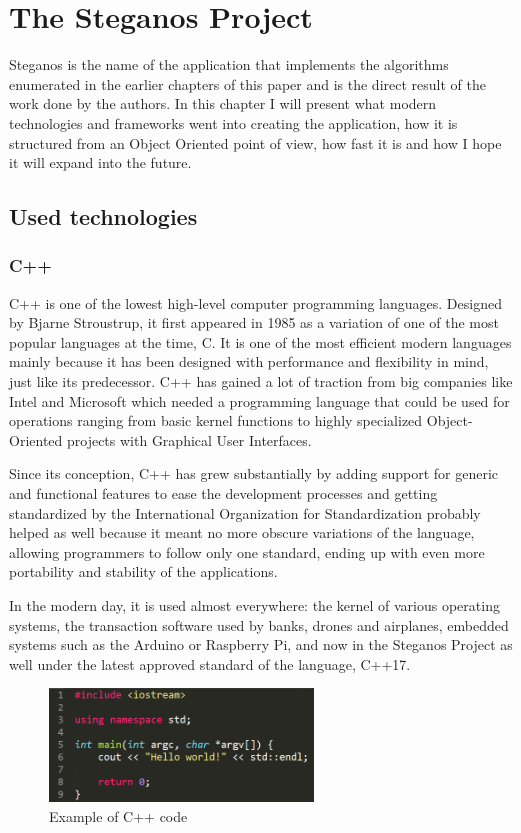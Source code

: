 
\chapter{The Steganos Project}
\begin{multicols*}{2}
Steganos is the name of the application that implements the algorithms enumerated in the earlier chapters of this paper and is the direct result of the work done by the authors. In this chapter I will present what modern technologies and frameworks went into creating the application, how it is structured from an Object Oriented point of view, how fast it is and how I hope it will expand into the future.

\section{Used technologies}
\subsection{C++}
C++ is one of the lowest high-level computer programming languages. Designed by Bjarne Stroustrup, it first appeared in 1985 as a variation of one of the most popular languages at the time, C. It is one of the most efficient modern languages mainly because it has been designed with performance and flexibility in mind, just like its predecessor. C++ has gained a lot of traction  from big companies like Intel and Microsoft which needed a programming language that could be used for operations ranging from basic kernel functions to highly specialized Object-Oriented projects with Graphical User Interfaces\cite{c++-programmming-language}.

Since its conception, C++ has grew substantially by adding support for generic and functional features to ease the development processes and getting standardized by the International Organization for Standardization probably helped as well because it meant no more obscure variations of the language, allowing programmers to follow only one standard, ending up with even more portability and stability of the applications.

In the modern day, it is used almost everywhere: the kernel of various operating systems, the transaction software used by banks, drones and airplanes, embedded systems such as the Arduino or Raspberry Pi, and now in the Steganos Project as well under the latest approved standard of the language, C++17.

\begin{figure}[H]
    \centering
    \includegraphics[width=7cm,keepaspectratio]{pics/example_of_cpp_code}
    \caption{Example of C++ code}
\end{figure}


\end{multicols*}
